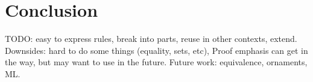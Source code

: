 \section{Conclusion}
\label{sec:conclusion}

TODO: easy to express rules, break into parts, reuse in other contexts, extend.
Downsides: hard to do some things (equality, sets, etc), Proof emphasis can get in the way, but
may want to use in the future. Future work: equivalence, ornaments, ML.

